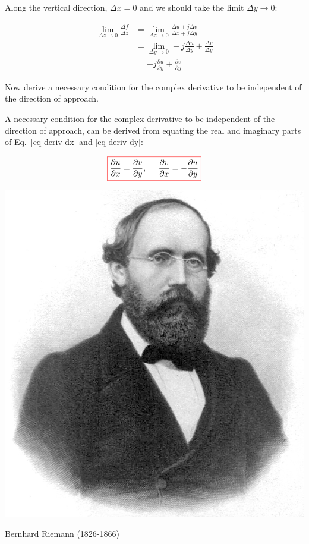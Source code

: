 Along the vertical direction, $\Delta x = 0$ and we should take the limit $\Delta y \to 0$:

\begin{align}
\lim_{\Delta z \to 0} \frac{\Delta f}{\Delta z}
& = \lim_{\Delta z \to 0} \frac{\Delta u + j \Delta v}{\Delta x + j \Delta y}
\nonumber \\
& = \lim_{\Delta y \to 0} -j\frac{\Delta u}{\Delta y} +  \frac{\Delta v}{\Delta
y} \nonumber \\
& = -j\frac{\partial u}{\partial y} +  \frac{\partial v}{\partial
y}\label{eq-deriv-dy}
\end{align}

\begin{cue}
Now derive a necessary condition for the complex derivative to be independent of the direction of approach.
\end{cue}

A necessary condition for the complex derivative to be independent of the direction of approach, can be derived from equating the real and imaginary parts of Eq.~\ref{eq-deriv-dx} and \ref{eq-deriv-dy}:

\begin{equation}
\fbox{$\displaystyle
\frac{\partial u}{\partial x} = \frac{\partial v}{\partial y}, \hspace{.5cm}
\frac{\partial v}{\partial x} = -\frac{\partial u}{\partial y}
\label{eq-Cauchy-Riemann}
$}
\end{equation} 

\begin{marginfigure}[-4.0cm]
  \includegraphics{complex/figures/b_riemann}
  \caption{Bernhard Riemann (1826-1866)}
\end{marginfigure}

